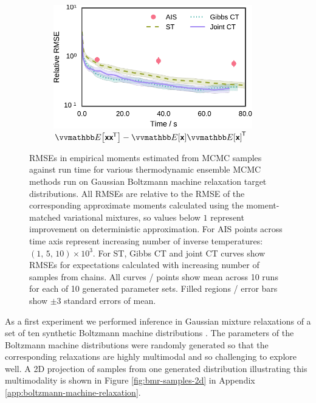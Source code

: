 \begin{figure}[t]
\begin{subfigure}[b]{.33\linewidth}
\vskip 0pt
\centering
\includegraphics[width=0.95\textwidth]{images/continuous-tempering/gaussian-bm-relaxation-30-unit-scale-6-covariance-rmses-t2} 
\caption{$\expc{\rvct{x}\rvct{x}\tr} - \expc{\rvct{x}}\expc{\rvct{x}}\tr$}\label{sfig:bmr-30-unit-scale-6-covar}
\end{subfigure}
\caption[Boltzmann machine relaxation results.]{\acp{RMSE} in empirical moments estimated from \ac{MCMC} samples against run time for various thermodynamic ensemble \ac{MCMC} methods run on Gaussian Boltzmann machine relaxation target distributions. All RMSEs are relative to the RMSE of the corresponding approximate moments calculated using the moment-matched variational mixtures, so values below $1$ represent improvement on deterministic approximation. For \ac{AIS} points across time axis represent increasing number of inverse temperatures: $(1,\, 5,\,10)\times 10^3$. For \ac{ST}, Gibbs \ac{CT} and joint \ac{CT} curves show RMSEs for expectations calculated with increasing number of samples from chains. All curves / points show mean across 10 runs for each of 10 generated parameter sets. Filled regions / error bars show $\pm 3$ standard errors of mean.}
\label{fig:bmr-30-unit-scale-6-results}
\end{figure}

As a first experiment we performed inference in Gaussian mixture relaxations of a set of ten synthetic Boltzmann machine distributions \citep{zhang2012continuous}. The parameters of the Boltzmann machine distributions were randomly generated so that the corresponding relaxations are highly multimodal and so challenging to explore well. A 2D projection of samples from one generated distribution illustrating this multimodality is shown in Figure \ref{fig:bmr-samples-2d} in Appendix \ref{app:boltzmann-machine-relaxation}.

